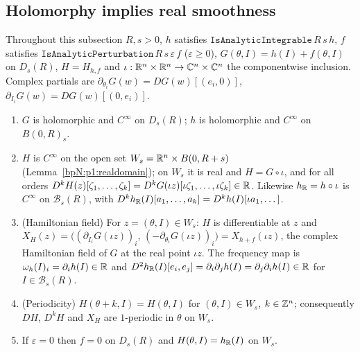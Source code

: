 \subsection{Holomorphy implies real smoothness}\label{bpN:p1:s-holo}

Throughout this subsection $R,s>0$, $h$ satisfies $\texttt{IsAnalyticIntegrable}\,R\,s\,h$, $f$ satisfies $\texttt{IsAnalyticPerturbation}\,R\,s\,\varepsilon\,f$ ($\varepsilon\ge0$),
$G(\theta,I)=h(I)+f(\theta,I)$ on $D_s(R)$, $H=H_{h,f}$ and $\iota:\mathbb{R}^n\times\mathbb{R}^n\to\mathbb{C}^n\times\mathbb{C}^n$ the componentwise inclusion. Complex partials are
$\partial_{\theta_i}G(w)=DG(w)[(e_i,0)]$, $\partial_{I_i}G(w)=DG(w)[(0,e_i)]$.

\begin{lemma}\label{bpN:p1:holo-real}
\begin{enumerate}[label=(\alph*)]
\item $G$ is holomorphic and $C^\infty$ on $D_s(R)$; $h$ is holomorphic and $C^\infty$ on $B(0,R)_s$.
\item $H$ is $C^\infty$ on the open set $W_s=\mathbb{R}^n\times B(0,R+s)$ (Lemma~\ref{bpN:p1:realdomain}); on $W_s$ it is real and $H=G\circ\iota$, and for all orders
  $D^kH(z)[\zeta_1,\dots,\zeta_k]=D^kG(\iota z)[\iota\zeta_1,\dots,\iota\zeta_k]\in\mathbb{R}$. Likewise $h_{\mathbb{R}}=h\circ\iota$ is $C^\infty$ on $\mathcal B_s(R)$, with
  $D^kh_{\mathbb{R}}(I)[a_1,\dots,a_k]=D^kh(I)[\iota a_1,\dots]$.
\item (Hamiltonian field) For $z=(\theta,I)\in W_s$: $H$ is differentiable at $z$ and
  $X_H(z)=\bigl((\partial_{I_i}G(\iota z))_i,\,(-\partial_{\theta_i}G(\iota z))_i\bigr)=X_{h+f}(\iota z)$, the complex Hamiltonian field of $G$ at the real point $\iota z$. The frequency map is
  $\omega_h(I)_i=\partial_ih(I)\in\mathbb{R}$ and $D^2h_{\mathbb{R}}(I)[e_i,e_j]=\partial_i\partial_jh(I)=\partial_j\partial_ih(I)\in\mathbb{R}$ for $I\in\mathcal B_s(R)$.
\item (Periodicity) $H(\theta+k,I)=H(\theta,I)$ for $(\theta,I)\in W_s$, $k\in\mathbb{Z}^n$; consequently $DH$, $D^kH$ and $X_H$ are $1$-periodic in $\theta$ on $W_s$.
\item If $\varepsilon=0$ then $f=0$ on $D_s(R)$ and $H(\theta,I)=h_{\mathbb{R}}(I)$ on $W_s$.
\end{enumerate}
\end{lemma}
